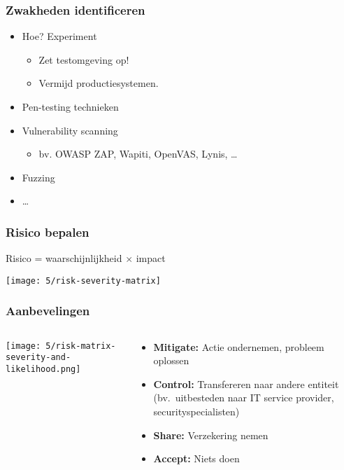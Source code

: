 \documentclass[aspectratio=169]{beamer}
\begin{document}
\begin{frame}
  \frametitle{Zwakheden identificeren}

  \begin{itemize}
    \item Hoe? Experiment
          \begin{itemize}
            \item Zet testomgeving op!
            \item Vermijd productiesystemen.
          \end{itemize}
    \item Pen-testing technieken
    \item Vulnerability scanning
          \begin{itemize}
            \item bv. OWASP ZAP, Wapiti, OpenVAS, Lynis, \ldots
          \end{itemize}
    \item Fuzzing
    \item \ldots
  \end{itemize}

\end{frame}

\begin{frame}
  \frametitle{Risico bepalen}

  \centering

  Risico = waarschijnlijkheid $\times$ impact

  \texttt{[image: 5/risk-severity-matrix]}

\end{frame}

\begin{frame}
  \frametitle{Aanbevelingen}

  \begin{columns}
    \begin{column}{.5\textwidth}
      \texttt{[image: 5/risk-matrix-severity-and-likelihood.png]}
    \end{column}

    \begin{column}{.5\textwidth}
      \begin{itemize}
        \item \textbf{Mitigate:} Actie ondernemen, probleem oplossen
        \item \textbf{Control:} Transfereren naar andere entiteit (bv.\ uitbesteden naar IT service provider, securityspecialisten)
        \item \textbf{Share:} Verzekering nemen
        \item \textbf{Accept:} Niets doen
      \end{itemize}
    \end{column}
  \end{columns}

\end{frame}
\end{document}
